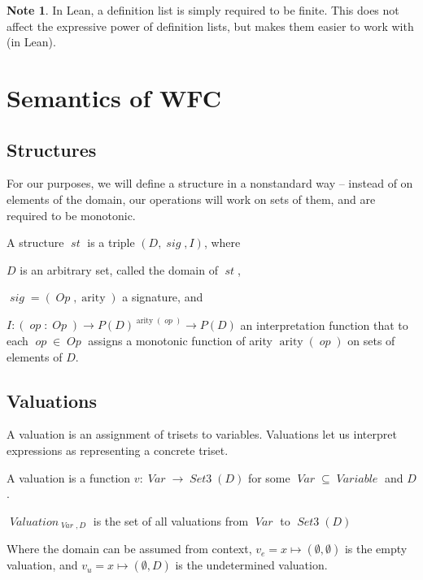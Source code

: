 \documentclass[oneside,12pt]{book}
\theoremstyle{definition}
\newtheorem*{note}{Note}
\theoremstyle{remark}
\newcommand\var[1]{\mathop{\mathit{#1}}\nolimits}
\newcommand{\pSet}{P}
\newcommand{\sig}{\var{sig}}
\DeclareMathOperator{\arity}{arity}
\newcommand{\op}{\var{op}}
\newcommand{\Op}{\var{Op}}
\newcommand{\st}{\var{st}}
\newcommand{\Var}{\var{Var}}
\newcommand{\SetIII}{\var{Set3}}
\newcommand{\Variable}{\var{Variable}}
\newcommand{\Valuation}{\var{Valuation}}
\begin{document}
\begin{note}
  In Lean, a definition list is simply required to be finite. This does
  not affect the expressive power of definition lists, but makes them
  easier to work with (in Lean).
\end{note}


\chapter{Semantics of WFC} \label{chapterSemanticsWFC}
\section{Structures}
For our purposes, we will define a structure in a nonstandard way -- instead
of on elements of the domain, our operations will work on sets of them,
and are required to be monotonic.

\begin{defBox}
  A structure $\st$ is a triple $(D, \sig, I)$, where
  \begin{compactitem}
    \item $D$ is an arbitrary set, called the domain of $\st$,
    \item $\sig = (\Op, \arity)$ a signature, and
    \item $I\colon (\op\colon \Op) \to \pSet(D)^{\arity(\op)} \to \pSet(D)$
      an interpretation function that to each $\op \in \Op$ assigns
      a monotonic function of arity $\arity(\op)$ on sets of elements of $D$.
  \end{compactitem}
\end{defBox}

\section{Valuations}

A valuation is an assignment of trisets to variables. Valuations
let us interpret expressions as representing a concrete triset.

\begin{defBox}
  A valuation is a function $v\colon \Var \to \SetIII(D)$ for some
  $\Var \subseteq \Variable$ and $D$.
  
  \medskip \noindent $\Valuation_{\Var,D}$ is the set of all valuations
  from $\Var$ to $\SetIII(D)$
  
  \medskip \noindent Where the domain can be assumed from context,
  $v_e = x \mapsto (\emptyset, \emptyset)$ is the empty valuation,
  and $v_u = x \mapsto (\emptyset, D)$ is the undetermined valuation.
\end{defBox}
\end{document}

